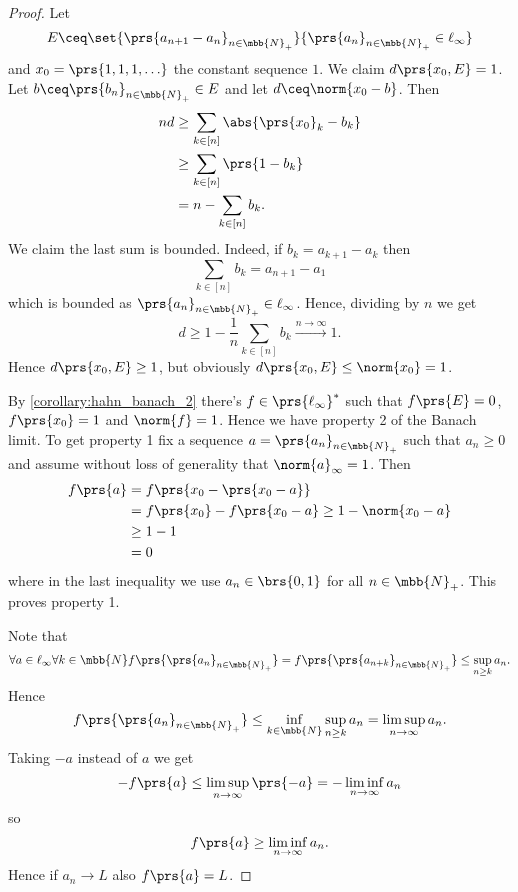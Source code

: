 \documentclass[10pt, twoside]{book}
\begin{document}
\begin{proof}
Let
\[E \ceq \set{\prs{a_{n+1} - a_n}_{n \in \mbb{N}_+}}{\prs{a_n}_{n \in \mbb{N}_+} \in \ell_\infty}\]
and $x_0 = \prs{1, 1, 1, \ldots}$ the constant sequence $1$. We claim
$d\prs{x_0, E} = 1$.
Let $b \ceq \prs{b_n}_{n \in \mbb{N}_+} \in E$ and let $d \ceq \norm{x_0 - b}$. Then
\begin{align*}
nd &\geq \sum_{k \in [n]} \abs{\prs{x_0}_k - b_k}
\\&\geq
\sum_{k \in [n]} \prs{1 - b_k}
\\&=
n - \sum_{k \in [n]} b_k \text{.}
\end{align*}
We claim the last sum is bounded. Indeed, if $b_k = a_{k+1} - a_k$ then
\[\sum_{k \in [n]} b_k = a_{n+1} - a_1\]
which is bounded as $\prs{a_n}_{n \in \mbb{N}_+} \in \ell_\infty$.
Hence, dividing by $n$ we get
\[d \geq 1 - \frac{1}{n} \sum_{k \in [n]} b_k \xrightarrow{n \to \infty} 1 \text{.}\]
Hence $d\prs{x_0, E} \geq 1$, but obviously $d\prs{x_0, E} \leq \norm{x_0} = 1$.

By \ref{corollary:hahn_banach_2} there's $f \in \prs{\ell_\infty}^*$ such that $f\prs{E} = 0$, $f\prs{x_0} = 1$ and $\norm{f} = 1$.
Hence we have property 2 of the Banach limit. To get property 1 fix a sequence $a = \prs{a_n}_{n \in \mbb{N}_+}$ such that $a_n \geq 0$ and assume without loss of generality that $\norm{a}_{\infty} = 1$.
Then
\begin{align*}
f\prs{a} &= f\prs{x_0 - \prs{x_0 - a}} \\&= f\prs{x_0} - f\prs{x_0 - a} \geq 1 - \norm{x_0 - a} \\&\geq 1 - 1 \\&= 0
\end{align*}
where in the last inequality we use $a_n \in \brs{0,1}$ for all $n \in \mbb{N}_+$. This proves property 1.

Note that
\begin{align*}
\forall a \in \ell_\infty \forall k \in \mbb{N} f\prs{\prs{a_n}_{n \in \mbb{N}_+}} = f\prs{\prs{a_{n+k}}_{n \in \mbb{N}_+}} \leq \sup_{n \geq k} a_n \text{.}
\end{align*}
Hence
\[f\prs{\prs{a_n}_{n \in \mbb{N}_+}} \leq \inf_{k \in \mbb{N}} \sup_{n \geq k} a_n = \limsup_{n \to \infty} a_n \text{.}\]
Taking $-a$ instead of $a$ we get
\[-f\prs{a} \leq \limsup_{n \to \infty}\prs{-a} = -\liminf_{n \to \infty} a_n\]
so
\[f\prs{a} \geq \liminf_{n\to\infty} a_n \text{.}\]
Hence if $a_n \to L$ also $f\prs{a} = L$.
\end{proof}
\end{document}
